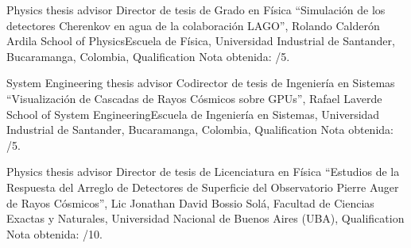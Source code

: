 \ifeng
Physics thesis advisor
 \else
Director de tesis de Grado en Física
 \fi
``Simulación de los detectores Cherenkov en agua de la colaboración LAGO'', Rolando Calderón Ardila \at \ifeng School of Physics\else Escuela de Física\fi, Universidad Industrial de Santander, Bucaramanga, Colombia, \ifeng Qualification \else Nota obtenida: /5. 

\ifeng
System Engineering thesis advisor
 \else
Codirector de tesis de Ingeniería en Sistemas
 \fi
``Visualización de Cascadas de Rayos Cósmicos sobre GPUs'', Rafael Laverde \at \ifeng School of System Engineering\else Escuela de Ingeniería en Sistemas\fi, Universidad Industrial de Santander, Bucaramanga, Colombia, \ifeng Qualification \else Nota obtenida: /5.

\ifeng
Physics thesis advisor
 \else
Director de tesis de Licenciatura en Física
 \fi
``Estudios de la Respuesta del Arreglo de Detectores de Superficie del Observatorio Pierre Auger de Rayos Cósmicos'', Lic Jonathan David Bossio Solá, \at Facultad de Ciencias Exactas y Naturales, Universidad Nacional de Buenos Aires (UBA), \ifeng Qualification \else Nota obtenida: /10.